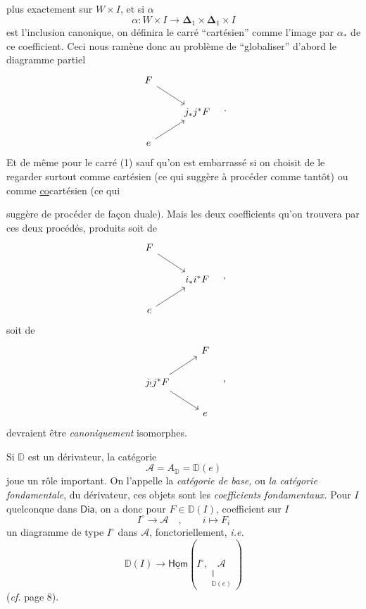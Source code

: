 \documentclass[11pt]{article}
\newcommand{\printedpage}[1]{\marginpar{\footnotesize p.~#1}}
\newcommand{\msp}[1]{\marginpar{\footnotesize [#1]}}
\newcommand{\uHom}{\underline{\mathsf{Hom}}}
\newcommand{\Dia}{\mathsf{Dia}}
\newcommand{\DD}{\mathbb{D}}
\newcommand{\Del}{\boldsymbol{\Delta}}
\begin{document}
\msp{page 10}

plus exactement sur $W \times I$, et si $\alpha$
\[ \alpha : W \times I \longrightarrow \Del_1 \times \Del_1 \times I \]
est l'inclusion canonique, on définira le carré “cartésien” comme l'image par $\alpha_*$ de ce coefficient. Ceci nous ramène donc au problème de “globaliser” d'abord le diagramme partiel
\[
\begin{tikzcd}
F \arrow[dr] & \\
& j_*j^*F \\
e \arrow[ur] &
\end{tikzcd}
\quad .
\]
Et de même pour le carré (1) sauf qu'on est embarrassé si on choisit de le regarder surtout comme cartésien (ce qui suggère à procéder comme tantôt) ou comme \underline{co}cartésien (ce qui %

\printedpage{9}
\noindent suggère de procéder de façon duale). Mais les deux coefficients qu’on trouvera par ces deux procédés, produits soit de
\[
\begin{tikzcd}
F \arrow[dr] & \\
 & i_*i^*F \\
e \arrow[ur] &
\end{tikzcd}
\quad ,
\]
soit de
\[
\begin{tikzcd}
 & F \\
j_!j^*F \arrow[ur] \arrow[dr] & \\
 & e
\end{tikzcd}
\quad ,
\]
devraient être \textit{canoniquement} isomorphes.

\noindent\msp{page 11}Si $\DD$ est un dérivateur, la catégorie
\[
\mathcal{A} = A_{\DD} = \DD(e) %
\]
joue un rôle important. On l’appelle la \textit{catégorie de base,} ou \textit{la catégorie fondamentale}, du dérivateur, ces objets sont les \textit{coefficients fondamentaux.} Pour $I$ quelconque dans $\Dia$, on a donc pour $F \in \DD(I)$, coefficient sur $I$ %
\[
I^\circ \longrightarrow \mathcal{A} \quad , \qquad i \longmapsto F_i
\]
un diagramme de type $I^\circ$ dans $\mathcal{A}$, fonctoriellement, \textit{i.e.}
\[
\DD(I)\longrightarrow
\uHom(I^\circ,\underset{\substack{\Vert\\\DD(e)}}{\mathcal A})
\]
(\textit{cf.} page 8).
\end{document}
